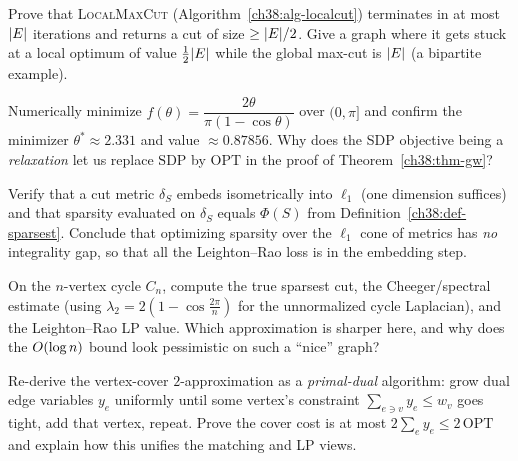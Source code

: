 \begin{exercise}\label{ch38:ex-maxcut-half}
Prove that \textsc{LocalMaxCut} (Algorithm~\ref{ch38:alg-localcut}) terminates in at most $\lvert E\rvert$
iterations and returns a cut of size $\ge\lvert E\rvert/2$. Give a graph where it gets stuck at a local
optimum of value $\tfrac12\lvert E\rvert$ while the global max-cut is $\lvert E\rvert$ (a bipartite example).
\end{exercise}

\begin{exercise}\label{ch38:ex-gw-curve}
Numerically minimize $f(\theta)=\dfrac{2\theta}{\pi(1-\cos\theta)}$ over $(0,\pi]$ and confirm the
minimizer $\theta^\ast\approx 2.331$ and value $\approx 0.87856$. Why does the SDP objective being a
\emph{relaxation} let us replace $\mathrm{SDP}$ by $\mathrm{OPT}$ in the proof of
Theorem~\ref{ch38:thm-gw}?
\end{exercise}

\begin{exercise}\label{ch38:ex-cut-metric}
Verify that a cut metric $\delta_S$ embeds isometrically into $\ell_1$ (one dimension suffices) and
that sparsity evaluated on $\delta_S$ equals $\Phi(S)$ from Definition~\ref{ch38:def-sparsest}.
Conclude that optimizing sparsity over the $\ell_1$ cone of metrics has \emph{no} integrality gap, so
that all the Leighton--Rao loss is in the embedding step.
\end{exercise}

\begin{exercise}\label{ch38:ex-cheeger-vs-lr}
On the $n$-vertex cycle $C_n$, compute the true sparsest cut, the Cheeger/spectral estimate (using
$\lambda_2 = 2(1-\cos\tfrac{2\pi}{n})$ for the unnormalized cycle Laplacian), and the
Leighton--Rao LP value. Which approximation is sharper here, and why does the $O(\log n)$ bound look
pessimistic on such a ``nice'' graph?
\end{exercise}

\begin{exercise}\label{ch38:ex-primal-dual-vc}
Re-derive the vertex-cover $2$-approximation as a \emph{primal-dual} algorithm: grow dual edge
variables $y_e$ uniformly until some vertex's constraint $\sum_{e\ni v} y_e \le w_v$ goes tight, add
that vertex, repeat. Prove the cover cost is at most $2\sum_e y_e \le 2\,\mathrm{OPT}$ and explain how
this unifies the matching and LP views.
\end{exercise}
